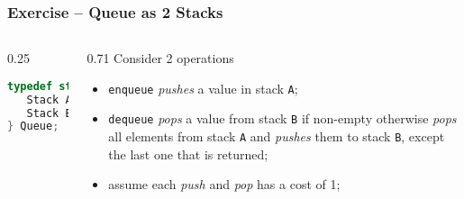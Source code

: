 \documentclass[aspectratio=169]{beamer}
\begin{document}
\begin{frame}[fragile]\frametitle{Exercise -- Queue as 2 Stacks}

\begin{columns}
\begin{column}{0.25\textwidth}
\begin{lstlisting}[language=C++,emph={Stack,Queue}]
typedef struct queue {
   Stack A;
   Stack B;
} Queue;
\end{lstlisting}
\end{column}
\begin{column}{0.71\textwidth}
Consider 2 operations
\begin{itemize}
    \item \texttt{enqueue} \emph{pushes} a value in stack \texttt{A};
    \item \texttt{dequeue} \emph{pops} a value from stack \texttt{B} if non-empty otherwise \emph{pops} all elements from stack \texttt{A} and \emph{pushes} them to stack \texttt{B}, except the last one that is returned;
    \item assume each \emph{push} and \emph{pop} has a cost of 1;
  \end{itemize}
\end{column}
\end{columns}

~\\[-3mm]
~\\[-11mm]
~\\[-11mm]
\end{frame}

\end{document}

